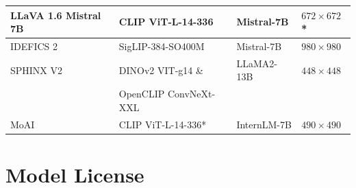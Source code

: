 \begin{table}[h]
{\begin{tabular}{llll@{}}
\midrule
LLaVA 1.6 Mistral 7B \cite{liu2024llavanext} & CLIP ViT-L-14-336 & Mistral-7B & $672\times672$* \\
\midrule
IDEFICS 2 \cite{laurenccon2024matters} & \cellcolor[HTML]{FFFFFF}SigLIP-384-SO400M & Mistral-7B & $980\times980$ \\
\midrule
SPHINX V2 \cite{gao2024sphinxx} & DINOv2 VIT-g14 \& & LLaMA2-13B & $448\times448$ \\
& OpenCLIP ConvNeXt-XXL & & \\
\midrule
MoAI \cite{lee2024moai} & CLIP ViT-L-14-336* & InternLM-7B & $490\times490$ \\
\bottomrule
\hline
\end{tabular}
}
\vspace{-0.7ex}
\label{tab:os_model_components}
\end{table}

\newpage
\section{Model License}


